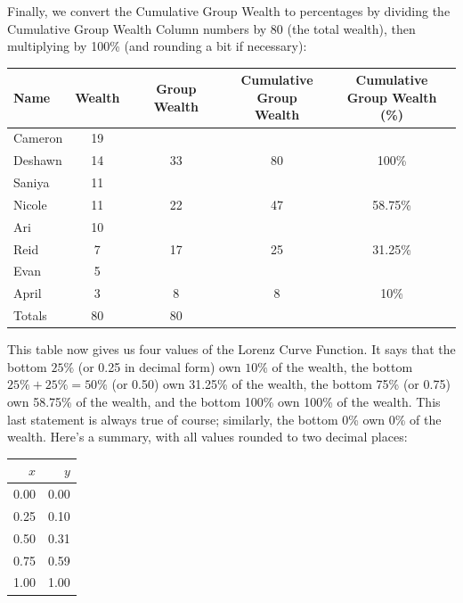 \documentclass[12pt]{memoir}\usepackage[]{graphicx}\usepackage[table]{xcolor}
\begin{document}
Finally, we convert the Cumulative Group Wealth to percentages by 
dividing the Cumulative Group Wealth Column numbers by 80 (the total wealth),
then multiplying by 100\% (and rounding a bit if necessary):

\begin{center}
\begin{tabular}{lcccc}
\toprule
Name & Wealth & Group Wealth & \makecell{Cumulative \\ Group Wealth} & \makecell{Cumulative \\ Group Wealth (\%)} \\ \midrule
\rowcolor{gray!50}
Cameron & 19 &  &  & \\ \midrule
\rowcolor{gray!50}
Deshawn & 14 & 33 & 80 & 100\% \\ \midrule
Saniya  & 11 &  &  & \\ \midrule
Nicole  & 11 & 22 & 47 & 58.75\% \\ \midrule
\rowcolor{gray!50}
Ari     & 10 &  &  & \\ \midrule
\rowcolor{gray!50}
Reid    & 7 & 17 & 25 & 31.25\% \\ \midrule
Evan    & 5  &  &  & \\ \midrule
April   & 3  & 8 & 8 & 10\% \\ \midrule
Totals  & 80  & 80  & & \\ \bottomrule
\end{tabular}
\end{center}

This table now gives us four values of the Lorenz Curve Function.  It 
says that the bottom $25\%$ (or 0.25 in decimal form) own $10\%$ of the
wealth, the bottom $25\% + 25\% = 50\%$ (or 0.50) own 31.25\% of the 
wealth, the bottom 75\% (or 0.75) own 58.75\% of the wealth, and the bottom 100\% 
own 100\% of the wealth.  This last statement is always true of course; similarly,
the bottom 0\% own 0\% of the wealth.  Here's a summary, with all values rounded 
to two decimal places: 

\begin{center}
\begin{tabular}{rr}
\toprule
$x$ & $y$ \\ \midrule
0.00   & 0.00 \\ \midrule
0.25 & 0.10 \\ \midrule
0.50 & 0.31 \\ \midrule
0.75 & 0.59 \\ \midrule
1.00 & 1.00 \\ \bottomrule
\end{tabular}
\end{center}
\end{document}
